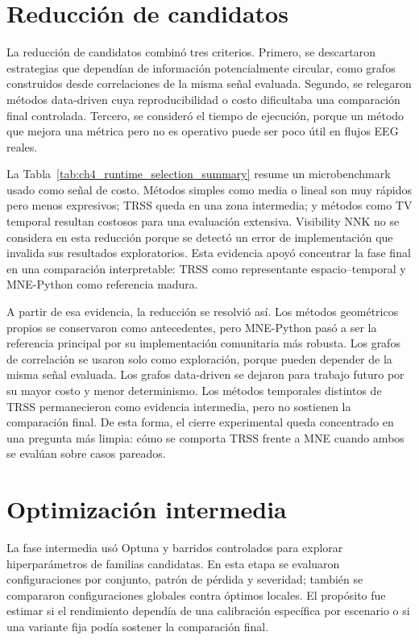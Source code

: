 \section{Reducción de candidatos}

La reducción de candidatos combinó tres criterios. Primero, se descartaron estrategias que dependían de información potencialmente circular, como grafos construidos desde correlaciones de la misma señal evaluada. Segundo, se relegaron métodos data-driven cuya reproducibilidad o costo dificultaba una comparación final controlada. Tercero, se consideró el tiempo de ejecución, porque un método que mejora una métrica pero no es operativo puede ser poco útil en flujos EEG reales.

La Tabla~\ref{tab:ch4_runtime_selection_summary} resume un microbenchmark usado como señal de costo. Métodos simples como media o lineal son muy rápidos pero menos expresivos; TRSS queda en una zona intermedia; y métodos como TV temporal resultan costosos para una evaluación extensiva. Visibility NNK no se considera en esta reducción porque se detectó un error de implementación que invalida sus resultados exploratorios. Esta evidencia apoyó concentrar la fase final en una comparación interpretable: TRSS como representante espacio--temporal y MNE-Python como referencia madura.



A partir de esa evidencia, la reducción se resolvió así. Los métodos geométricos propios se conservaron como antecedentes, pero MNE-Python pasó a ser la referencia principal por su implementación comunitaria más robusta. Los grafos de correlación se usaron solo como exploración, porque pueden depender de la misma señal evaluada. Los grafos data-driven se dejaron para trabajo futuro por su mayor costo y menor determinismo. Los métodos temporales distintos de TRSS permanecieron como evidencia intermedia, pero no sostienen la comparación final. De esta forma, el cierre experimental queda concentrado en una pregunta más limpia: cómo se comporta TRSS frente a MNE cuando ambos se evalúan sobre casos pareados.

\section{Optimización intermedia}

La fase intermedia usó Optuna y barridos controlados para explorar hiperparámetros de familias candidatas. En esta etapa se evaluaron configuraciones por conjunto, patrón de pérdida y severidad; también se compararon configuraciones globales contra óptimos locales. El propósito fue estimar si el rendimiento dependía de una calibración específica por escenario o si una variante fija podía sostener la comparación final.

